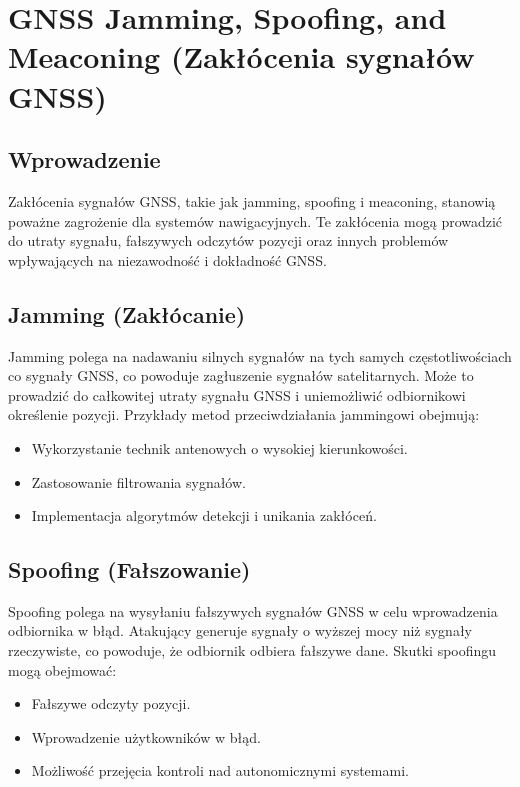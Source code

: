 
\section{GNSS Jamming, Spoofing, and Meaconing (Zakłócenia sygnałów GNSS)}

\subsection{Wprowadzenie}

Zakłócenia sygnałów GNSS, takie jak jamming, spoofing i meaconing, stanowią poważne zagrożenie dla systemów nawigacyjnych. Te zakłócenia mogą prowadzić do utraty sygnału, fałszywych odczytów pozycji oraz innych problemów wpływających na niezawodność i dokładność GNSS.

\subsection{Jamming (Zakłócanie)}

Jamming polega na nadawaniu silnych sygnałów na tych samych częstotliwościach co sygnały GNSS, co powoduje zagłuszenie sygnałów satelitarnych. Może to prowadzić do całkowitej utraty sygnału GNSS i uniemożliwić odbiornikowi określenie pozycji. Przykłady metod przeciwdziałania jammingowi obejmują:

\begin{itemize}
    \item Wykorzystanie technik antenowych o wysokiej kierunkowości.
    \item Zastosowanie filtrowania sygnałów.
    \item Implementacja algorytmów detekcji i unikania zakłóceń.
\end{itemize}

\subsection{Spoofing (Fałszowanie)}

Spoofing polega na wysyłaniu fałszywych sygnałów GNSS w celu wprowadzenia odbiornika w błąd. Atakujący generuje sygnały o wyższej mocy niż sygnały rzeczywiste, co powoduje, że odbiornik odbiera fałszywe dane. Skutki spoofingu mogą obejmować:

\begin{itemize}
    \item Fałszywe odczyty pozycji.
    \item Wprowadzenie użytkowników w błąd.
    \item Możliwość przejęcia kontroli nad autonomicznymi systemami.
\end{itemize}

